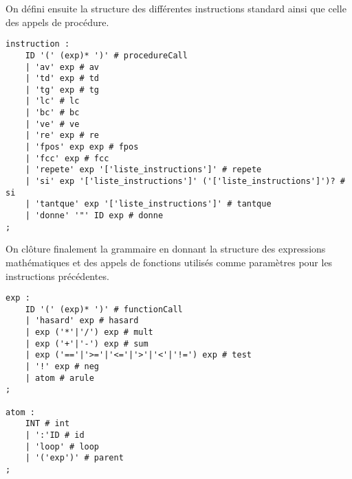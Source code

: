 \documentclass[a4paper,11pt]{article}
\begin{document}
On défini ensuite la structure des différentes instructions standard ainsi que celle des appels de procédure.
\begin{lstlisting}
instruction :
    ID '(' (exp)* ')' # procedureCall
    | 'av' exp # av
    | 'td' exp # td
    | 'tg' exp # tg
    | 'lc' # lc
    | 'bc' # bc
    | 've' # ve
    | 're' exp # re
    | 'fpos' exp exp # fpos
    | 'fcc' exp # fcc
    | 'repete' exp '['liste_instructions']' # repete
    | 'si' exp '['liste_instructions']' ('['liste_instructions']')? # si
    | 'tantque' exp '['liste_instructions']' # tantque
    | 'donne' '"' ID exp # donne
;
\end{lstlisting}

On clôture finalement la grammaire en donnant la structure des expressions mathématiques et des appels de fonctions utilisés comme paramètres pour les instructions précédentes.
\begin{lstlisting}
exp :
    ID '(' (exp)* ')' # functionCall
    | 'hasard' exp # hasard
    | exp ('*'|'/') exp # mult
    | exp ('+'|'-') exp # sum
    | exp ('=='|'>='|'<='|'>'|'<'|'!=') exp # test
    | '!' exp # neg
    | atom # arule
;

atom :
    INT # int
    | ':'ID # id
    | 'loop' # loop
    | '('exp')' # parent
;
\end{lstlisting}
\end{document}
